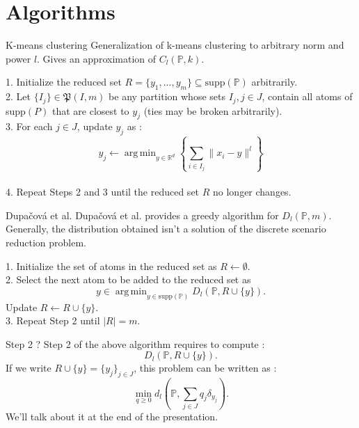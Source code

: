 \documentclass{beamer}
\newcommand{\R}{\mathbb{R}}
\DeclareMathOperator*{\argmin}{arg\,min}
\theoremstyle{plain}
\begin{document}
\section{Algorithms}
\begin{frame}{K-means clustering}
Generalization of k-means clustering to arbitrary norm and power $l$. Gives an approximation of $C_l\left(\mathbb{P},k\right).$
\begin{algorithm}[H]
    \caption{k-means clustering for $C_l\left(\mathbb{P},m\right)$}
    1. Initialize the reduced set $R=\{y_1,...,y_m\} \subseteq \text{supp}\left(\mathbb{P}\right)$ arbitrarily. \\ 2. Let $\{I_j\}\in\mathfrak{P}\left(I,m\right)$ be any partition whose sets $I_j, j\in J$, contain all atoms of supp$\left(P\right)$ that are closest to $y_j$ (ties may be broken arbitrarily). \\ 3. For each $j\in J$, update $y_j$ as : 
    \[
      y_j \gets \argmin_{y\in\R^d} \left\{ \sum_{i\in I_j} \lVert x_i-y \rVert^l \right\}
    \] 
    \\ 4. Repeat Steps 2 and 3 until the reduced set $R$ no longer changes.
\end{algorithm}
\end{frame}

\begin{frame}{Dupačová et al.}
Dupačová et al. \cite{dupacova_scenario_2003} provides a greedy algorithm for $D_l\left(\mathbb{P},m\right)$. Generally, the distribution obtained isn't a solution of the discrete scenario reduction problem.
\begin{algorithm}[H]
  \caption{Dupačová et al.}\label{dupacova}
  1. Initialize the set of atoms in the reduced set as $R\gets \emptyset.$ \\ 2. Select the next atom to be added to the reduced set as $$ y\in\argmin_{y\in \text{supp}\left(\mathbb{P}\right)}D_l\left(\mathbb{P},R\cup\{y\}\right).
  $$
  Update $R\gets R\cup \{y\}$.\\ 3. Repeat Step 2 until $\lvert R\rvert=m$.
\end{algorithm}
\end{frame}

\begin{frame}{Step 2 ?}
    Step 2 of the above algorithm requires to compute :
    $$
    D_l\left(\mathbb{P},R\cup\{y\}\right).
    $$
    If we write $R\cup\{y\}=\{y_j\}_{j\in J}$, this problem can be written as : 
    $$
    \min_{q\geq 0}d_l\left(\mathbb{P}, \sum_{j\in J}q_j\delta_{y_j}\right).
    $$
    We'll talk about it at the end of the presentation.
\end{frame}
\end{document}
